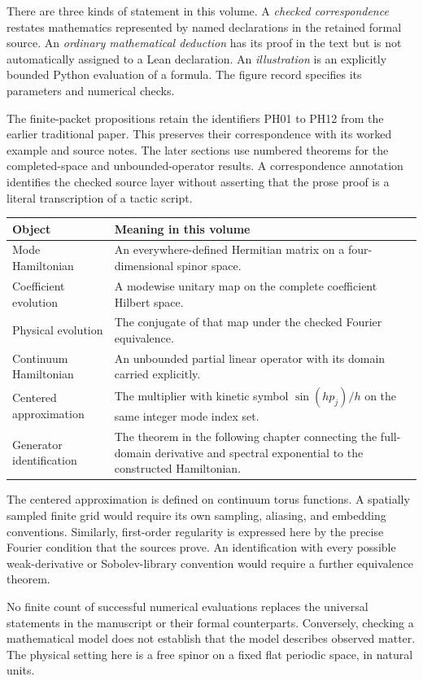There are three kinds of statement in this volume. A \emph{checked correspondence} restates mathematics represented by named declarations in the retained formal source. An \emph{ordinary mathematical deduction} has its proof in the text but is not automatically assigned to a Lean declaration. An \emph{illustration} is an explicitly bounded Python evaluation of a formula. The figure record specifies its parameters and numerical checks.

The finite-packet propositions retain the identifiers PH01 to PH12 from the earlier traditional paper. This preserves their correspondence with its worked example and source notes. The later sections use numbered theorems for the completed-space and unbounded-operator results. A correspondence annotation identifies the checked source layer without asserting that the prose proof is a literal transcription of a tactic script.

\begin{longtable}{@{}L{.24\linewidth}L{.67\linewidth}@{}}
\toprule
Object & Meaning in this volume\\\midrule\endhead
Mode Hamiltonian & An everywhere-defined Hermitian matrix on a four-dimensional spinor space.\\
Coefficient evolution & A modewise unitary map on the complete coefficient Hilbert space.\\
Physical evolution & The conjugate of that map under the checked Fourier equivalence.\\
Continuum Hamiltonian & An unbounded partial linear operator with its domain carried explicitly.\\
Centered approximation & The multiplier with kinetic symbol $\sin(hp_j)/h$ on the same integer mode index set.\\
Generator identification & The theorem in the following chapter connecting the full-domain derivative and spectral exponential to the constructed Hamiltonian.\\
\bottomrule
\end{longtable}

The centered approximation is defined on continuum torus functions. A spatially sampled finite grid would require its own sampling, aliasing, and embedding conventions. Similarly, first-order regularity is expressed here by the precise Fourier condition that the sources prove. An identification with every possible weak-derivative or Sobolev-library convention would require a further equivalence theorem.

No finite count of successful numerical evaluations replaces the universal statements in the manuscript or their formal counterparts. Conversely, checking a mathematical model does not establish that the model describes observed matter. The physical setting here is a free spinor on a fixed flat periodic space, in natural units.

